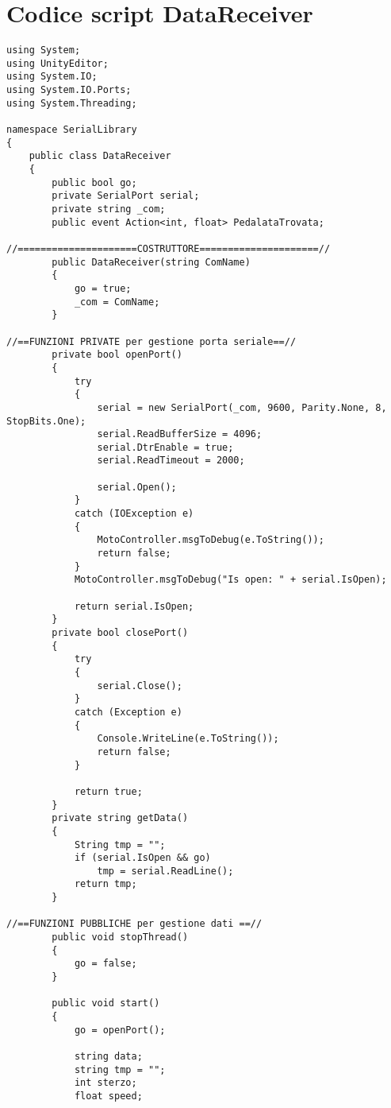 \chapter{Codice script DataReceiver}
\label{receiver}
\thispagestyle{empty}

\begin{lstlisting}
using System;
using UnityEditor;
using System.IO;
using System.IO.Ports;
using System.Threading;

namespace SerialLibrary
{
    public class DataReceiver
    {
        public bool go;
        private SerialPort serial;
        private string _com;
        public event Action<int, float> PedalataTrovata;

//=====================COSTRUTTORE=====================//
        public DataReceiver(string ComName)
        {
            go = true;
            _com = ComName;
        }
		
//==FUNZIONI PRIVATE per gestione porta seriale==//
        private bool openPort()
        {
            try
            {
                serial = new SerialPort(_com, 9600, Parity.None, 8, StopBits.One);
                serial.ReadBufferSize = 4096;
                serial.DtrEnable = true;
                serial.ReadTimeout = 2000;

                serial.Open();
            }
            catch (IOException e)
            {
                MotoController.msgToDebug(e.ToString());
                return false;
            }
            MotoController.msgToDebug("Is open: " + serial.IsOpen);

            return serial.IsOpen;
        }
        private bool closePort()
        {
            try
            {
                serial.Close();
            }
            catch (Exception e)
            {
                Console.WriteLine(e.ToString());
                return false;
            }

            return true;
        }
        private string getData()
        {
            String tmp = "";
            if (serial.IsOpen && go)
                tmp = serial.ReadLine();
            return tmp;
        }

//==FUNZIONI PUBBLICHE per gestione dati ==//
        public void stopThread()
        {
            go = false;
        }

        public void start()
        {
            go = openPort();

            string data;
            string tmp = "";
            int sterzo;
            float speed;


\end{lstlisting}
